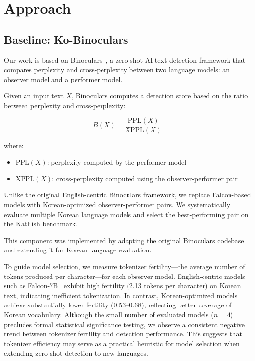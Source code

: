 \documentclass{article}
\begin{document}
\section{Approach}

\subsection{Baseline: Ko-Binoculars}

Our work is based on Binoculars~\cite{hans2024binoculars}, a zero-shot AI text detection framework that compares perplexity and cross-perplexity between two language models: an observer model and a performer model.

Given an input text \(X\), Binoculars computes a detection score based on the ratio between perplexity and cross-perplexity:

\[
B(X)=\frac{\mathrm{PPL}(X)}{\mathrm{XPPL}(X)}
\]

where:

\begin{itemize}
    \item \(\mathrm{PPL}(X)\): perplexity computed by the performer model
    \item \(\mathrm{XPPL}(X)\): cross-perplexity computed using the observer-performer pair
\end{itemize}

Unlike the original English-centric Binoculars framework, we replace Falcon-based models with Korean-optimized observer-performer pairs. We systematically evaluate multiple Korean language models and select the best-performing pair on the KatFish benchmark.

This component was implemented by adapting the original Binoculars codebase and extending it for Korean language evaluation.

To guide model selection, we measure tokenizer fertility---the average number of tokens produced per character---for each observer model. English-centric models such as Falcon-7B~\cite{penedo2023falcon} exhibit high fertility (2.13 tokens per character) on Korean text, indicating inefficient tokenization. In contrast, Korean-optimized models achieve substantially lower fertility (0.53--0.68), reflecting better coverage of Korean vocabulary. Although the small number of evaluated models ($n=4$) precludes formal statistical significance testing, we observe a consistent negative trend between tokenizer fertility and detection performance. This suggests that tokenizer efficiency may serve as a practical heuristic for model selection when extending zero-shot detection to new languages.
\end{document}
